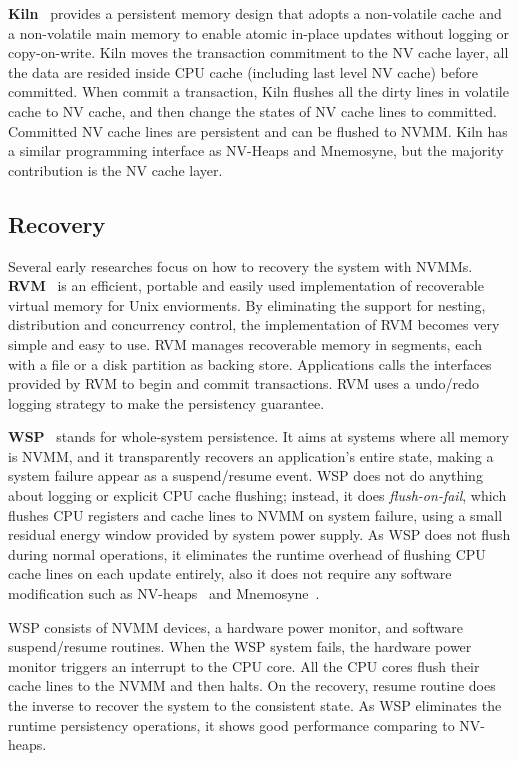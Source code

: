 \textbf{Kiln}~\cite{Kiln} provides a persistent memory design
 that adopts a non-volatile
cache and a non-volatile main memory to enable atomic in-place updates without
logging or copy-on-write. Kiln moves the transaction commitment to the NV
cache layer, all the data are resided inside CPU cache (including last level
NV cache) before committed. When commit a transaction, Kiln flushes all
the dirty lines in volatile cache to NV cache, and then change the states of
NV cache lines to committed. Committed NV cache lines are persistent and
can be flushed to NVMM. Kiln has a similar programming interface as NV-Heaps
and Mnemosyne, but the majority contribution is the NV cache layer.

\subsection{Recovery} 
\label{sec:recovery}

Several early researches focus on how to recovery the system with NVMMs.
\textbf{RVM}~\cite{RVM} is an efficient,
 portable and easily used implementation of
recoverable virtual memory for Unix enviorments. By eliminating the support
for nesting, distribution and concurrency control, the implementation of 
RVM becomes very simple and easy to use. RVM manages recoverable memory in
segments, each with a file or a disk partition as backing store. Applications
calls the interfaces provided by RVM to begin and commit transactions. RVM
uses a undo/redo logging strategy to make the persistency guarantee. 

\textbf{WSP}~\cite{WSP} stands for whole-system persistence.
 It aims at systems where
all memory is NVMM, and it transparently recovers an application's entire state,
making a system failure appear as a suspend/resume event. WSP does not
do anything about logging or explicit CPU cache flushing; instead, it does 
\emph{flush-on-fail}, which flushes CPU registers and cache lines to NVMM
on system failure, using a small residual energy window provided by system
power supply. As WSP does not flush during normal operations, it eliminates
the runtime overhead of flushing CPU cache lines on each update entirely, also
it does not require any software modification such as NV-heaps~\cite{nvheaps}
 and Mnemosyne~\cite{mnemosyne}.

WSP consists of NVMM devices, a hardware power monitor, and software suspend/resume routines. When the WSP system fails, the hardware power monitor triggers
an interrupt to the CPU core. All the CPU cores flush their cache lines to the 
NVMM and then halts. On the recovery, resume routine does the inverse to recover
the system to the consistent state. As WSP eliminates the runtime persistency
operations, it shows good performance comparing to NV-heaps.


